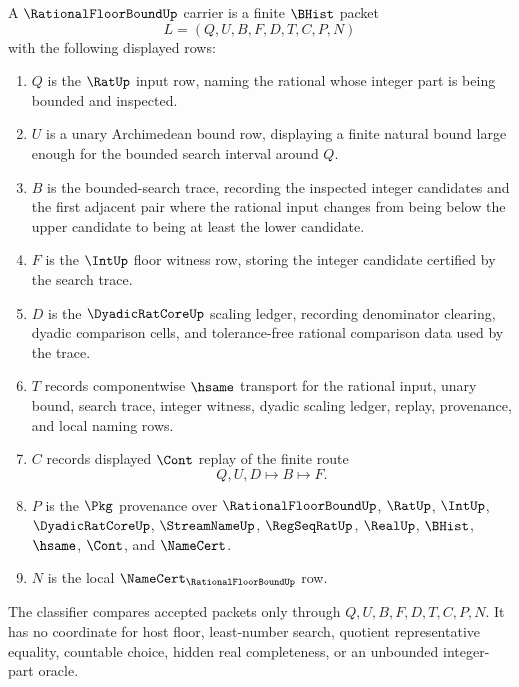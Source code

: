 \begin{definition}
\label{def:rational-floor-bound-carrier}
A $\RationalFloorBoundUp$ carrier is a finite $\BHist$ packet
$$
L=(Q,U,B,F,D,T,C,P,N)
$$
with the following displayed rows:
\begin{enumerate}
\item $Q$ is the $\RatUp$ input row, naming the rational whose integer part is being bounded and inspected.
\item $U$ is a unary Archimedean bound row, displaying a finite natural bound large enough for the bounded search interval around $Q$.
\item $B$ is the bounded-search trace, recording the inspected integer candidates and the first adjacent pair where the rational input changes from being below the upper candidate to being at least the lower candidate.
\item $F$ is the $\IntUp$ floor witness row, storing the integer candidate certified by the search trace.
\item $D$ is the $\DyadicRatCoreUp$ scaling ledger, recording denominator clearing, dyadic comparison cells, and tolerance-free rational comparison data used by the trace.
\item $T$ records componentwise $\hsame$ transport for the rational input, unary bound, search trace, integer witness, dyadic scaling ledger, replay, provenance, and local naming rows.
\item $C$ records displayed $\Cont$ replay of the finite route
$$
Q,U,D \longmapsto B \longmapsto F .
$$
\item $P$ is the $\Pkg$ provenance over $\RationalFloorBoundUp$, $\RatUp$, $\IntUp$, $\DyadicRatCoreUp$, $\StreamNameUp$, $\RegSeqRatUp$, $\RealUp$, $\BHist$, $\hsame$, $\Cont$, and $\NameCert$.
\item $N$ is the local $\NameCert_{\RationalFloorBoundUp}$ row.
\end{enumerate}
The classifier compares accepted packets only through $Q,U,B,F,D,T,C,P,N$. It has no coordinate for host floor, least-number search, quotient representative equality, countable choice, hidden real completeness, or an unbounded integer-part oracle.
\end{definition}

